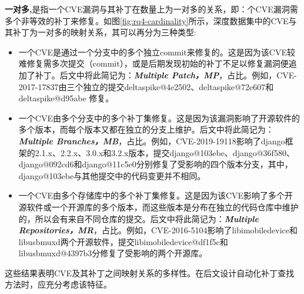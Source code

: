 \textbf{一对多,}是指一个CVE漏洞与其补丁在数量上为一对多的关系，即：个CVE漏洞需多个非等效的补丁来修复。如图\ref{fig:rq4-cardinality}所示，深度数据集中的CVE与其补丁为一对多的映射关系，其可以再分为三种类型: 

\begin{itemize}[leftmargin=*]
\item 一个CVE是通过一个分支中的多个独立commit来修复的。这是因为该CVE较难修复需多次提交（commit），或是后期发现初始的补丁不足以修复漏洞便追加了补丁。后文中将此简记为：\textbf{\textit{Multiple Patch，MP}}，占比。例如，CVE-2017-17837由三个独立的提交deltaspike@4e2502\cite{deltaspike-1}、deltaspike@72e607\cite{deltaspike-2}和deltaspike@d95abe\cite{deltaspike-3} 修复。
\item 一个CVE由多个分支中的多个补丁集修复。这是因为该漏洞影响了开源软件的多个版本，而每个版本又都在独立的分支上维护。后文中将此简记为：\textbf{\textit{Multiple Branches，MB}}，占比。例如，CVE-2019-19118影响了django框架的2.1.x、2.2.x、3.0.x和3.2.x版本，提交django@103ebe\cite{django-1}、django@36f580\cite{django-2}、django@092cd6\cite{django-3}和django@11c5e0\cite{django-4}分别修复了受影响的四个版本分支，其中，django@103ebe与其他提交中的代码变更并不相同。
\item 一个CVE由多个存储库中的多个补丁集修复。这是因为该CVE影响了多个开源软件或一个开源库的多个版本，而这些版本是分布在独立的代码仓库中维护的，所以会有来自不同仓库的提交。后文中将此简记为：\textbf{\textit{Multiple Repositories，MR}}，占比。例如，CVE-2016-5104影响了libimobiledevice和libusbmuxd两个开源软件，提交libimobiledevice@df1f5c\cite{libimobiledevice}和libusbmuxd@4397b3\cite{libusbmuxd}分修复了受影响的两个开源库。

\end{itemize}

这些结果表明CVE及其补丁之间映射关系的多样性。在后文设计自动化补丁查找方法时，应充分考虑该特征。

